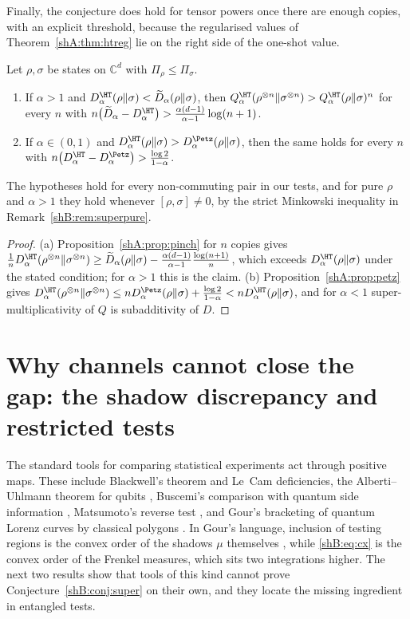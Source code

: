 Finally, the conjecture does hold for tensor powers once there are enough copies, with an explicit threshold, because the regularised values of Theorem~\ref{shA:thm:htreg} lie on the right side of the one-shot value.

\begin{proposition}\label{shB:prop:manycopies}
Let $\rho,\sigma$ be states on $\mathbb C^d$ with $\Pi_\rho\le\Pi_\sigma$.
\begin{enumerate}[label=(\alph*)]
\item If $\alpha>1$ and $D^\HT_\alpha(\rho\|\sigma)<\widetilde D_\alpha(\rho\|\sigma)$, then $Q^\HT_\alpha(\rho^{\otimes n}\|\sigma^{\otimes n})>Q^\HT_\alpha(\rho\|\sigma)^n$ for every $n$ with $n\big(\widetilde D_\alpha-D^\HT_\alpha\big)>\frac{\alpha(d-1)}{\alpha-1}\log(n+1)$.
\item If $\alpha\in(0,1)$ and $D^\HT_\alpha(\rho\|\sigma)>D^\Petz_\alpha(\rho\|\sigma)$, then the same holds for every $n$ with $n\big(D^\HT_\alpha-D^\Petz_\alpha\big)>\frac{\log2}{1-\alpha}$.
\end{enumerate}
The hypotheses hold for every non-commuting pair in our tests, and for pure $\rho$ and $\alpha>1$ they hold whenever $[\rho,\sigma]\ne0$, by the strict Minkowski inequality in Remark~\ref{shB:rem:superpure}.
\end{proposition}

\begin{proof}
(a) Proposition~\ref{shA:prop:pinch} for $n$ copies gives $\frac1nD^\HT_\alpha(\rho^{\otimes n}\|\sigma^{\otimes n})\ge\widetilde D_\alpha(\rho\|\sigma)-\frac{\alpha(d-1)}{\alpha-1}\frac{\log(n+1)}{n}$, which exceeds $D^\HT_\alpha(\rho\|\sigma)$ under the stated condition; for $\alpha>1$ this is the claim. (b) Proposition~\ref{shA:prop:petz} gives $D^\HT_\alpha(\rho^{\otimes n}\|\sigma^{\otimes n})\le nD^\Petz_\alpha(\rho\|\sigma)+\frac{\log2}{1-\alpha}<nD^\HT_\alpha(\rho\|\sigma)$, and for $\alpha<1$ super-multiplicativity of $Q$ is subadditivity of $D$.
\end{proof}

\section{Why channels cannot close the gap: the shadow discrepancy and restricted tests}\label{shB:sec:restricted}

The standard tools for comparing statistical experiments act through positive maps. These include Blackwell's theorem and Le~Cam deficiencies, the Alberti--Uhlmann theorem for qubits \cite{AlbertiUhlmann1980}, Buscemi's comparison with quantum side information \cite{Buscemi2012}, Matsumoto's reverse test \cite{Matsumoto2018newf}, and Gour's bracketing of quantum Lorenz curves by classical polygons \cite{Gour2026}. In Gour's language, inclusion of testing regions is the convex order of the shadows $\mu$ themselves \cite[Cor.~7]{Gour2026}, while \eqref{shB:eq:cx} is the convex order of the Frenkel measures, which sits two integrations higher. The next two results show that tools of this kind cannot prove Conjecture~\ref{shB:conj:super} on their own, and they locate the missing ingredient in entangled tests.

